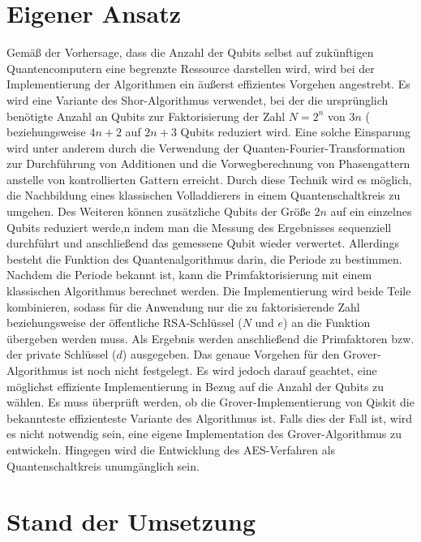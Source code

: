\documentclass[
	a4paper, %
	10pt, %
	unnumberedsections, %
	twoside, %
]{LTJournalArticle}
\begin{document}
\section{Eigener Ansatz}

Gemäß der Vorhersage, dass die Anzahl der Qubits selbst auf zukünftigen Quantencomputern eine begrenzte Ressource darstellen wird\autocite{zalka1998fast}, wird bei der Implementierung der Algorithmen ein äußerst effizientes Vorgehen angestrebt. 
Es wird eine Variante des Shor-Algorithmus verwendet, bei der die ursprünglich benötigte Anzahl an Qubits zur Faktorisierung der Zahl $N = 2^{n}$ von $3n$ (\autocite{zalka1998fast} beziehungsweise $4n+2$\autocite{IBM:Shor_docu} auf $2n+3$ Qubits reduziert wird\autocite{beauregard2003circuit}.
Eine solche Einsparung wird unter anderem durch die Verwendung der Quanten-Fourier-Transformation zur Durchführung von Additionen und die Vorwegberechnung von Phasengattern anstelle von kontrollierten Gattern erreicht. Durch diese Technik wird es möglich, die Nachbildung eines klassischen Volladdierers in einem Quantenschaltkreis zu umgehen\autocite{draper2000addition}. Des Weiteren können zusätzliche Qubits der Größe $2n$ auf ein einzelnes Qubits reduziert werde,n indem man die Messung des Ergebnisses sequenziell durchführt und anschließend das gemessene Qubit wieder verwertet\autocite{Parker_2000}. 
Allerdings besteht die Funktion des Quantenalgorithmus darin, die Periode zu bestimmen. Nachdem die Periode bekannt ist, kann die Primfaktorisierung mit einem klassischen Algorithmus berechnet werden. Die Implementierung wird beide Teile kombinieren, sodass für die Anwendung nur die zu faktorisierende Zahl beziehungsweise der öffentliche RSA-Schlüssel ($N$ und $e$) an die Funktion übergeben werden muss. Als Ergebnis werden anschließend die Primfaktoren bzw. der private Schlüssel ($d$) ausgegeben.
\hfill \break
Das genaue Vorgehen für den Grover-Algorithmus ist noch nicht festgelegt. Es wird jedoch darauf geachtet, eine möglichst effiziente Implementierung in Bezug auf die Anzahl der Qubits zu wählen. Es muss überprüft werden, ob die Grover-Implementierung von Qiskit die bekannteste effizienteste Variante des Algorithmus ist. Falls dies der Fall ist, wird es nicht notwendig sein, eine eigene Implementation des Grover-Algorithmus zu entwickeln. Hingegen wird die Entwicklung des AES-Verfahren als Quantenschaltkreis unumgänglich sein.

\section{\LARGE Stand der Umsetzung}
\end{document}

